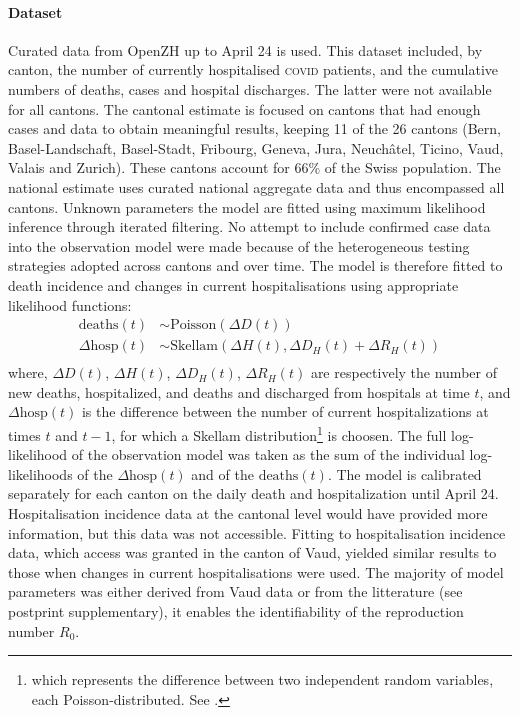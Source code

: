 \paragraph{Dataset} Curated data from OpenZH\cite[3\baselineskip]{openZH:OpenZHCovid19:2020} up to April 24 is used. This dataset included, by canton, the number of currently hospitalised \textsc{covid} patients, and the cumulative numbers of deaths, cases and hospital discharges. The latter were not available for all cantons. The cantonal estimate is focused on cantons that had enough cases and data to obtain meaningful results, keeping 11 of the 26 cantons (Bern, Basel-Landschaft, Basel-Stadt, Fribourg, Geneva, Jura, Neuchâtel, Ticino, Vaud, Valais and Zurich). These cantons account for 66\% of the Swiss population. The national estimate uses curated national aggregate data and thus encompassed all cantons\cite{Probst:DaenuprobstCovid19casesswitzerland:2020}. Unknown parameters the model are fitted using maximum likelihood inference through iterated filtering\cite{Ionides:InferenceDynamicLatent:2015}. No attempt to include confirmed case data into the observation model were made because of the heterogeneous testing strategies adopted across cantons and over time. The model is therefore fitted to death incidence and changes in current hospitalisations using appropriate likelihood functions:
\begin{equation}
\begin{split}
 \text{deaths}(t) &\sim \text{Poisson}(\Delta D(t)) \\
\Delta  \text{hosp}(t) &\sim \text{Skellam}(\Delta H(t), \Delta D_H(t) + \Delta R_H(t)) \\
\end{split}
\end{equation}
\noindent where, $\Delta D(t)$, $\Delta H(t)$, $\Delta D_H(t)$, $\Delta R_H(t)$ are respectively the number of new deaths, hospitalized, and deaths and discharged from hospitals at time $t$, and $\Delta \text{hosp}(t)$ is the difference between the number of current hospitalizations at times $t$ and $t-1$, for which a Skellam distribution\footnote{which represents the difference between two independent random variables, each Poisson-distributed. See .} is choosen. The full log-likelihood of the observation model was taken as the sum of the individual log-likelihoods of the $\Delta \text{hosp}(t)$ and of the $\text{deaths}(t)$. 
The model is calibrated separately for each canton on the daily death and hospitalization until April 24. Hospitalisation incidence data at the cantonal level would have provided more information, but this data was not accessible. Fitting to hospitalisation incidence data, which access was granted in the canton of Vaud, yielded similar results to those when changes in current hospitalisations were used. The majority of model parameters was either derived from Vaud data or from the litterature (see postprint supplementary), it enables the identifiability of the reproduction number $R_0$.
 
